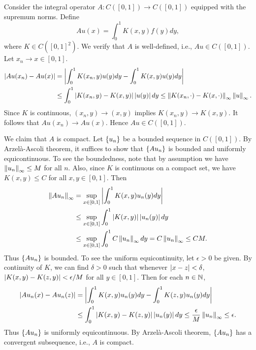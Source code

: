 \begin{example}
    Consider the integral operator $A:C([0,1])\to C([0,1])$ equipped with the 
    supremum norms. Define 
    \begin{equation*}
        Au(x) = \int_0^1 K(x,y)f(y)dy,
    \end{equation*}
    where $K\in C([0,1]^2)$. We verify that $A$ is well-defined, i.e., 
    $Au\in C([0,1])$. Let $x_n\to x\in [0,1]$. 
    \begin{equation*}
        \begin{split}
            \left\lvert {Au(x_n) - Au(x)} \right\rvert &= \left\lvert {\int_0^1 K(x_n,y)u(y)dy - \int_0^1 K(x,y)u(y)dy} \right\rvert \\
            &\leq \int_0^1 \left\lvert {K(x_n,y) - K(x,y)} \right\rvert\left\lvert {u(y)} \right\rvert dy 
            \leq \left\lVert {K(x_n,\cdot) - K(x,\cdot)} \right\rVert_\infty\left\lVert {u} \right\rVert_\infty.
        \end{split}
    \end{equation*}
    Since $K$ is continuous, $(x_n,y)\to (x,y)$ implies $K(x_n,y)\to K(x,y)$. 
    It follows that $Au(x_n)\to Au(x)$. Hence $Au\in C([0,1])$.

    We claim that $A$ is compact. Let $\left\{ {u_n} \right\}$ be 
    a bounded sequence in $C([0,1])$. By Arzel\`a-Ascoli theorem, it suffices 
    to show that $\left\{ {Au_n} \right\}$ is bounded and uniformly equicontinuous. To see 
    the boundedness, note that by assumption we have $\left\lVert {u_n} \right\rVert_\infty\leq M$ 
    for all $n$. Also, since $K$ is continuous on a compact set, we have 
    $K(x,y)\leq C$ for all $x,y\in [0,1]$. Then 
    \begin{equation*}
        \begin{split}
            \left\lVert {Au_n} \right\rVert_\infty &= \sup_{x\in [0,1]}\left\lvert {\int_0^1 K(x,y)u_n(y)dy} \right\rvert \\
            &\leq \sup_{x\in [0,1]}\int_0^1 \left\lvert {K(x,y)} \right\rvert\left\lvert {u_n(y)} \right\rvert dy \\
            &\leq \sup_{x\in [0,1]}\int_0^1 C\left\lVert {u_n} \right\rVert_\infty dy = C\left\lVert {u_n} \right\rVert_\infty \leq CM.
        \end{split}
    \end{equation*} 
    Thus $\left\{ {Au_n} \right\}$ is bounded. To see the uniform equicontinuity, let 
    $\epsilon>0$ be given. By continuity of $K$, we can find $\delta>0$ such that 
    whenever $\left\lvert {x-z} \right\rvert<\delta$, $\left\lvert {K(x,y) - K(z,y)} \right\rvert<\epsilon/M$ for all $y\in [0,1]$. 
    Then for each $n\in\mathbb{N}$, 
    \begin{equation*}
        \begin{split}
            \left\lvert {Au_n(x) - Au_n(z)} \right\rvert &= \left\lvert {\int_0^1 K(x,y)u_n(y)dy - \int_0^1 K(z,y)u_n(y)dy} \right\rvert \\
            &\leq \int_0^1 \left\lvert {K(x,y) - K(z,y)} \right\rvert\left\lvert {u_n(y)} \right\rvert dy 
            \leq \frac{\epsilon}{M}\left\lVert {u_n} \right\rVert_\infty \leq \epsilon.
        \end{split}
    \end{equation*}
    Thus $\left\{ {Au_n} \right\}$ is uniformly equicontinuous. By Arzel\`a-Ascoli theorem, 
    $\left\{ {Au_n} \right\}$ has a convergent subsequence, i.e., $A$ is compact.

\end{example}